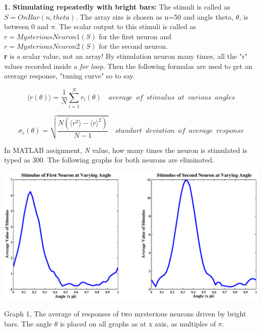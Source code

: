 \documentclass{article}
\begin{document}
\setcounter{tocdepth}{1}
\textbf{1.} \textbf{Stimulating repeatedly with bright bars:} The stimuli is called as $S=OnBar(n, theta)$. The array size is chosen as n=50 and angle theta, $\theta$, is between 0 and $\pi$. The scalar output to this stimuli is called as $r=MysteriousNeuron1(S)$ for the first neuron and $r=MysteriousNeuron2(S)$ for the second neuron. \\

\textbf{r} is a scalar value, not an array! By stimulation neuron many times, all the "r" values recorded inside a \textit{for loop}. Then the following formulas are used to get an average response, "tuning curve" so to say. 

\begin{equation}
 \langle r(\theta) \rangle=\frac{1}{N} \sum\limits_{i=1}^{N}r_i(\theta) \,\,\,\,\,\,{average\,\,\,of\,\,\,stimulus\,\,\,at\,\,\,various \,\,\,angles}
\end{equation}

\begin{equation}
 \sigma_r(\theta)=\sqrt{ \frac{N (\langle r^2 \rangle-\langle r \rangle ^2 ) }{N-1}  }\,\,\,\,\,\,{standart\,\,\,deviation\,\,\,of\,\,\,average\,\,\,response}
\end{equation}

In MATLAB assignment, \textit{N} value, how many times the neuron is stimulated is typed as 300. The following graphs for both neurons are eliminated.

\begin{center}
 \includegraphics[width=\textwidth]{f1_on.eps}
\begin{footnotesize}Graph 1, The average of responses of two mysterious neurons driven by bright bars. The angle $\theta$ is placed on all graphs as at x axis, as multiples of $\pi$.\end{footnotesize}
\end{center}
\end{document}
